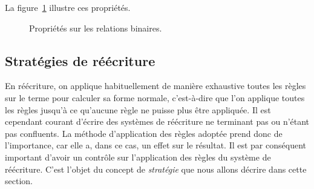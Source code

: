La figure~\ref{fig:proprietes_binRel} illustre ces propriétés.
\begin{figure}[H]
  \begin{center}
  
    \caption{Propriétés sur les relations binaires.}
    \label{fig:proprietes_binRel}
  \end{center}
\end{figure}


\subsection{Stratégies de réécriture}

En réécriture, on applique habituellement de manière exhaustive toutes les
règles sur le terme pour calculer sa forme normale, c'est-à-dire que l'on
applique toutes les règles jusqu'à ce qu'aucune règle ne puisse plus être
appliquée. Il est cependant courant d'écrire des systèmes de réécriture ne
terminant pas ou n'étant pas confluents. La méthode d'application des règles
adoptée prend donc de l'importance, car elle a, dans ce cas, un effet sur le
résultat. Il est par conséquent important d'avoir un contrôle sur l'application
des règles du système de réécriture. C'est l'objet du concept de
\emph{stratégie} que nous allons décrire dans cette section.

